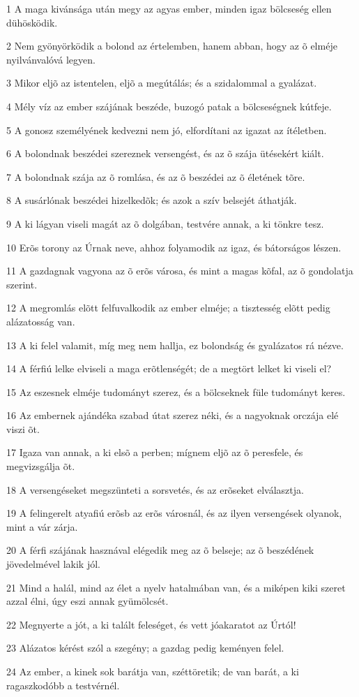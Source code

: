 \par 1 A maga kivánsága után megy az agyas ember, minden igaz bölcseség ellen dühösködik.
\par 2 Nem gyönyörködik a bolond az értelemben, hanem abban, hogy az õ elméje nyilvánvalóvá legyen.
\par 3 Mikor eljõ az istentelen, eljõ a megútálás; és a szidalommal a gyalázat.
\par 4 Mély víz az ember szájának beszéde, buzogó patak a bölcseségnek kútfeje.
\par 5 A gonosz személyének kedvezni nem jó, elfordítani az igazat az ítéletben.
\par 6 A bolondnak beszédei szereznek versengést, és az õ szája ütésekért kiált.
\par 7 A bolondnak szája az õ romlása, és az õ beszédei az õ életének tõre.
\par 8 A susárlónak beszédei hizelkedõk; és azok a szív belsejét áthatják.
\par 9 A ki lágyan viseli magát az õ dolgában, testvére annak, a ki tönkre tesz.
\par 10 Erõs torony az Úrnak neve, ahhoz folyamodik az igaz, és bátorságos lészen.
\par 11 A gazdagnak vagyona az õ erõs városa, és mint a magas kõfal, az õ gondolatja szerint.
\par 12 A megromlás elõtt felfuvalkodik az ember elméje; a tisztesség elõtt pedig  alázatosság van.
\par 13 A ki felel valamit, míg meg nem hallja, ez bolondság és gyalázatos rá nézve.
\par 14 A férfiú lelke elviseli a maga erõtlenségét; de a megtört lelket ki viseli el?
\par 15 Az eszesnek elméje tudományt szerez, és a bölcseknek füle tudományt keres.
\par 16 Az embernek ajándéka szabad útat szerez néki, és a nagyoknak orczája elé viszi õt.
\par 17 Igaza van annak, a ki elsõ a perben; mígnem eljõ az õ peresfele, és megvizsgálja õt.
\par 18 A versengéseket megszünteti a sorsvetés, és az erõseket elválasztja.
\par 19 A felingerelt atyafiú erõsb az erõs városnál, és az ilyen versengések olyanok, mint a vár zárja.
\par 20 A férfi szájának hasznával elégedik meg az õ belseje; az õ beszédének jövedelmével lakik jól.
\par 21 Mind a halál, mind az élet a nyelv hatalmában van, és a miképen kiki szeret azzal élni, úgy eszi annak gyümölcsét.
\par 22 Megnyerte a jót, a ki talált feleséget, és vett jóakaratot az Úrtól!
\par 23 Alázatos kérést szól a szegény; a gazdag pedig keményen felel.
\par 24 Az ember, a kinek sok barátja van, széttöretik; de van barát, a ki ragaszkodóbb a testvérnél.

